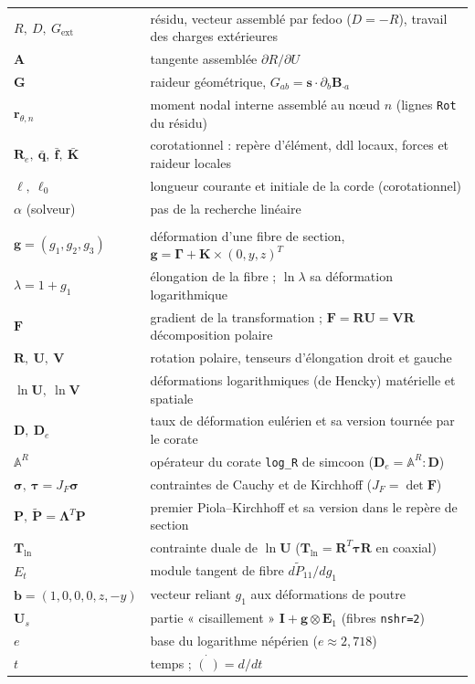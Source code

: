 \documentclass[11pt,a4paper]{article}
\newcommand{\Lam}{\bm{\Lambda}}
\newcommand{\Gam}{\bm{\Gamma}}
\newcommand{\Kv}{\mathbf{K}}
\newcommand{\code}[1]{\texttt{#1}}
\begin{document}
\begin{longtable}{>{\raggedright}p{3.1cm}p{11.9cm}}
$R,\ D,\ G_{\text{ext}}$ & résidu, vecteur assemblé par fedoo ($D=-R$), travail des charges extérieures\\
$\mathbf A$ & tangente assemblée $\partial R/\partial U$\\
$\mathbf G$ & raideur géométrique, $G_{ab}=\mathbf s\cdot\partial_b\mathbf B_{\cdot a}$\\
$\mathbf r_{\theta,n}$ & moment nodal interne assemblé au nœud $n$ (lignes \code{Rot} du résidu)\\
$\mathbf R_e,\ \bar{\mathbf q},\ \bar{\mathbf f},\ \bar{\mathbf K}$ & corotationnel : repère d'élément, ddl locaux, forces et raideur locales\\
$\ell,\ \ell_0$ & longueur courante et initiale de la corde (corotationnel)\\
$\alpha$ (solveur) & pas de la recherche linéaire\\
\multicolumn{2}{l}{\emph{Fibres en grandes déformations}}\\
$\mathbf g=(g_1,g_2,g_3)$ & déformation d'une fibre de section, $\mathbf g=\Gam+\Kv\times(0,y,z)^T$\\
$\lambda=1+g_1$ & élongation de la fibre ; $\ln\lambda$ sa déformation logarithmique\\
$\mathbf F$ & gradient de la transformation ; $\mathbf F=\mathbf R\mathbf U=\mathbf V\mathbf R$ décomposition polaire\\
$\mathbf R,\ \mathbf U,\ \mathbf V$ & rotation polaire, tenseurs d'élongation droit et gauche\\
$\ln\mathbf U,\ \ln\mathbf V$ & déformations logarithmiques (de Hencky) matérielle et spatiale\\
$\mathbf D,\ \mathbf D_e$ & taux de déformation eulérien et sa version tournée par le corate\\
$\mathbb A^R$ & opérateur du corate \code{log\_R} de simcoon ($\mathbf D_e=\mathbb A^R:\mathbf D$)\\
$\bm\sigma,\ \bm\tau=J_F\bm\sigma$ & contraintes de Cauchy et de Kirchhoff ($J_F=\det\mathbf F$)\\
$\mathbf P,\ \tilde{\mathbf P}=\Lam^T\mathbf P$ & premier Piola--Kirchhoff et sa version dans le repère de section\\
$\mathbf T_{\ln}$ & contrainte duale de $\ln\mathbf U$ ($\mathbf T_{\ln}=\mathbf R^T\bm\tau\mathbf R$ en coaxial)\\
$E_t$ & module tangent de fibre $d\tilde P_{11}/dg_1$\\
$\mathbf b=(1,0,0,0,z,-y)$ & vecteur reliant $g_1$ aux déformations de poutre\\
$\mathbf U_s$ & partie « cisaillement » $\mathbf I+\mathbf g\otimes\mathbf E_1$ (fibres \code{nshr=2})\\
$e$ & base du logarithme népérien ($e\approx2{,}718$)\\
$t$ & temps ; $\dot{(\ )}=d/dt$\\
\bottomrule
\end{longtable}
\normalsize
\end{document}
